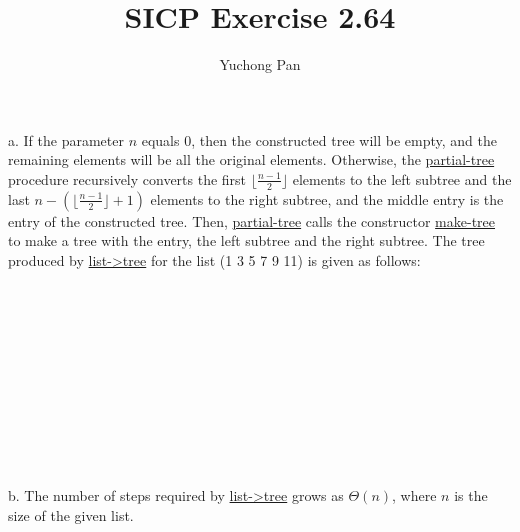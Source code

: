 \documentclass[11pt, oneside]{article}
\title{SICP Exercise 2.64}
\author{Yuchong Pan}
\begin{document}
\maketitle

a. If the parameter $n$ equals 0, then the constructed tree will be empty, and the remaining elements will be all the original elements. Otherwise, the \url{partial-tree} procedure recursively converts the first $\lfloor \frac{n-1}{2} \rfloor$ elements to the left subtree and the last $n - \left( \lfloor \frac{n-1}{2} \rfloor + 1 \right)$ elements to the right subtree, and the middle entry is the entry of the constructed tree. Then, \url{partial-tree} calls the constructor \url{make-tree} to make a tree with the entry, the left subtree and the right subtree. The tree produced by \url{list->tree} for the list (1 3 5 7 9 11) is given as follows:

~

~

~

\begin{center}
\end{center}

~

~

~

b. The number of steps required by \url{list->tree} grows as $\Theta(n)$, where $n$ is the size of the given list.
\end{document}
